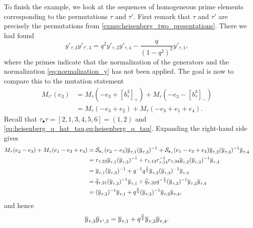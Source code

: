 \begin{example}
	To finish the example, we look at the sequences of homogeneous prime elements
	corresponding to the permutations $\tau$ and $\tau'$. First remark that $\tau$ and
	$\tau'$ are precisely the permutations from \cref{exmp:heisenberg_two_presentations}.
	There we had found
	\begin{equation}\label{eq:heisenber_almost_mutation}
		y'_{\tau, 3}y'_{\tau', 3} = q^2 y'_{\tau, 2}y'_{\tau, 4} - \frac{q}{(1-q^2)^2}y'_{\tau, 1},
	\end{equation}
	where the primes indicate that the normalization of the generators and the
	normalization \cref{eq:normalization_y} has not been applied. The goal is now to
	compare this to the mutation statement
	\begin{align*}
		M_{\tau'}(e_3)
		 & = M_{\tau}(-e_3 + [b^3_{\tau}]_{+}) + M_\tau(-e_3 - [b^3_{\tau}]_{-}) \\
		 & = M_{\tau}(-e_3 + e_2) + M_{\tau}(-e_3 + e_1 + e_4).
	\end{align*}
	Recall that $\tau_\bullet\tau = [2,1,3,4,5,6] = (1,2)$ and \cref{eq:heisenberg_q_hat_tau,eq:heisenberg_q_tau}. Expanding the right-hand side gives
	\begin{align*}
		M_{\tau}(e_2 - e_3) + M_{\tau}(e_1 - e_3 + e_4)
		 & = \mathcal{S}_{\mathbf{r}_\tau}(e_2 - e_3)\overline{y}_{\tau, 1}(\overline{y}_{\tau, 3})^{-1} + \mathcal{S}_{\mathbf{r}_\tau}(e_1 -e_3 + e_4)\overline{y}_{\tau, 2}(\overline{y}_{\tau, 3})^{-1} \overline{y}_{\tau, 4} \\
		 & = r_{\tau, 23}\overline{y}_{\tau, 1}(\overline{y}_{\tau, 3})^{-1} + r_{\tau, 13}r_{\tau, 14}^{-1} r_{\tau, 34}\overline{y}_{\tau, 2}(\overline{y}_{\tau, 3})^{-1} \overline{y}_{\tau, 4}       \\
		 & = \overline{y}_{\tau, 1}(\overline{y}_{\tau, 3})^{-1} + q^{-1} q^{\frac{1}{2}} \overline{y}_{\tau, 2}(\overline{y}_{\tau, 3})^{-1} \overline{y}_{\tau, 4}                                      \\
		 & = \widehat{q}_{\tau, 31}(\overline{y}_{\tau, 3})^{-1}\overline{y}_{\tau, 1} + \widehat{q}_{\tau, 32}q^{-\frac{1}{2}}(\overline{y}_{\tau, 3})^{-1} \overline{y}_{\tau, 2}\overline{y}_{\tau, 4}          \\
		 & = (\overline{y}_{\tau, 3})^{-1}\overline{y}_{\tau, 1} + q^{\frac{3}{2}}(\overline{y}_{\tau, 3})^{-1} \overline{y}_{\tau, 2}\overline{y}_{\tau, 4},
	\end{align*}
	and hence
	\begin{equation}\label{eq:heisenberg_real_mutation}
		\overline{y}_{\tau, 3}\overline{y}_{\tau',3} = \overline{y}_{\tau, 1} + q^{\frac{3}{2}}\overline{y}_{\tau, 2}\overline{y}_{\tau, 4}.
	\end{equation}


\end{example}
